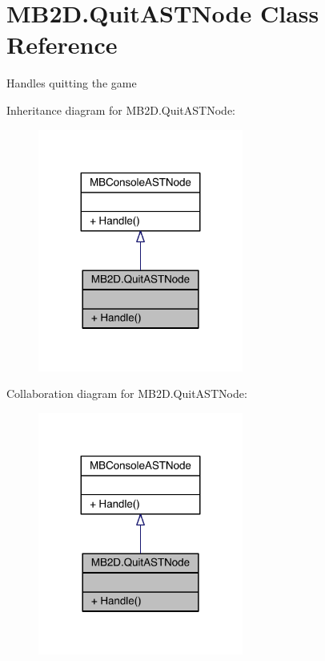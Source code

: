 \hypertarget{class_m_b2_d_1_1_quit_a_s_t_node}{}\section{M\+B2\+D.\+Quit\+A\+S\+T\+Node Class Reference}
\label{class_m_b2_d_1_1_quit_a_s_t_node}


Handles quitting the game  




Inheritance diagram for M\+B2\+D.\+Quit\+A\+S\+T\+Node\+:\nopagebreak
\begin{figure}[H]
\begin{center}
\leavevmode
\includegraphics[width=191pt]{class_m_b2_d_1_1_quit_a_s_t_node__inherit__graph}
\end{center}
\end{figure}


Collaboration diagram for M\+B2\+D.\+Quit\+A\+S\+T\+Node\+:\nopagebreak
\begin{figure}[H]
\begin{center}
\leavevmode
\includegraphics[width=191pt]{class_m_b2_d_1_1_quit_a_s_t_node__coll__graph}
\end{center}
\end{figure}
